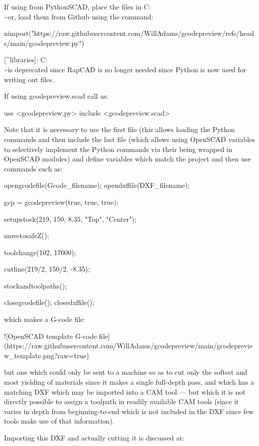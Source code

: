 \documentclass{ltxdoc}
\begin{document}
\begin{readme}
If using from PythonSCAD, place the files in C:\Users\\\~\Documents\OpenSCAD\libraries [^libraries] or, load them from Github using the command:

    nimport("https://raw.githubusercontent.com/WillAdams/gcodepreview/refs/heads/main/gcodepreview.py")

[^libraries]: C:\Users\\\~\Documents\RapCAD\libraries is deprecated since RapCAD is no longer needed since Python is now used for writing out files.

If using gcodepreview.scad call as:

    use <gcodepreview.py>
    include <gcodepreview.scad>

Note that it is necessary to use the first file (this allows loading the Python commands and then include the last file (which allows using OpenSCAD variables to selectively implement the Python commands via their being wrapped in OpenSCAD modules) and define variables which match the project and then use commands such as:

    opengcodefile(Gcode_filename);
    opendxffile(DXF_filename);
    
    gcp = gcodepreview(true, true, true);

    setupstock(219, 150, 8.35, "Top", "Center");
    
    movetosafeZ();
    
    toolchange(102, 17000);
    
    cutline(219/2, 150/2, -8.35);

    stockandtoolpaths();
    
    closegcodefile();
    closedxffile();

which makes a G-code file:

![OpenSCAD template G-code file](https://raw.githubusercontent.com/WillAdams/gcodepreview/main/gcodepreview_template.png?raw=true)

but one which could only be sent to a machine so as to cut only the softest and most yielding of materials since it makes a single full-depth pass, and which has a matching DXF which may be imported into a CAM tool --- but which it is not directly possible to assign a toolpath in readily available CAM tools (since it varies in depth from beginning-to-end which is not included in the DXF since few tools make use of that information). 

Importing this DXF and actually cutting it is discussed at:


\end{readme}
\end{document}
